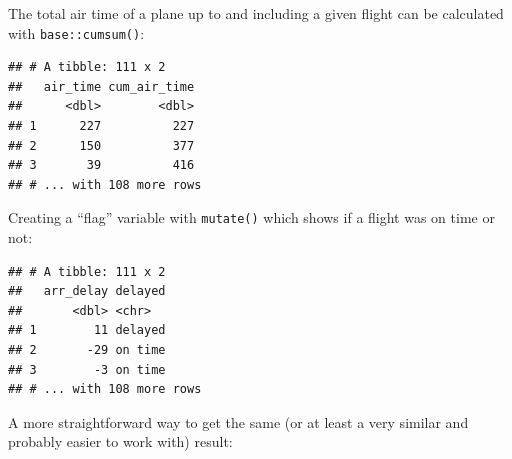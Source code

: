 \documentclass[]{book}
\newenvironment{Shaded}{}{}
\newcommand{\DataTypeTok}[1]{#1}
\newcommand{\DecValTok}[1]{#1}
\newcommand{\KeywordTok}[1]{\textcolor[rgb]{0.00,0.00,1.00}{#1}}
\newcommand{\NormalTok}[1]{#1}
\newcommand{\OperatorTok}[1]{#1}
\newcommand{\StringTok}[1]{\textcolor[rgb]{0.00,0.50,0.50}{#1}}
\begin{document}
The total air time of a plane up to and including a given flight can be calculated with \texttt{base::cumsum()}:

\begin{Shaded}
\end{Shaded}

\begin{verbatim}
## # A tibble: 111 x 2
##   air_time cum_air_time
##      <dbl>        <dbl>
## 1      227          227
## 2      150          377
## 3       39          416
## # ... with 108 more rows
\end{verbatim}

Creating a ``flag'' variable with \texttt{mutate()} which shows if a flight was on time or not:

\begin{Shaded}
\end{Shaded}

\begin{verbatim}
## # A tibble: 111 x 2
##   arr_delay delayed
##       <dbl> <chr>  
## 1        11 delayed
## 2       -29 on time
## 3        -3 on time
## # ... with 108 more rows
\end{verbatim}

A more straightforward way to get the same (or at least a very similar and probably easier to work with) result:

\begin{Shaded}
\end{Shaded}
\end{document}
